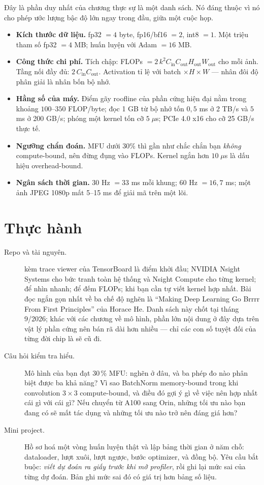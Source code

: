 \documentclass[../../deep_learning.tex]{subfiles}
\begin{document}
Đây là phần duy nhất của chương thực sự là một danh sách. Nó đáng thuộc vì nó cho phép ước lượng bậc độ lớn ngay trong đầu, giữa một cuộc họp.

\begin{itemize}
\item \textbf{Kích thước dữ liệu.} fp32 \(=4\) byte, fp16/bf16 \(=2\), int8 \(=1\). Một triệu tham số fp32 \(=4\) MB; huấn luyện với Adam \(=16\) MB.
\item \textbf{Công thức chi phí.} Tích chập: FLOPs \(= 2\,k^2 C_{\text{in}} C_{\text{out}} H_{\text{out}} W_{\text{out}}\) cho mỗi ảnh. Tầng nối đầy đủ: \(2\,C_{\text{in}}C_{\text{out}}\). Activation tỉ lệ với batch \(\times H \times W\) --- nhân đôi độ phân giải là nhân bốn bộ nhớ.
\item \textbf{Hằng số của máy.} Điểm gãy roofline của phần cứng hiện đại nằm trong khoảng \(100\)--\(350\) FLOP/byte; đọc 1 GB từ bộ nhớ tốn \(0{,}5\) ms ở 2 TB/s và \(5\) ms ở 200 GB/s; phóng một kernel tốn cỡ \(5\;\mu\)s; PCIe 4.0 x16 cho cỡ 25 GB/s thực tế.
\item \textbf{Ngưỡng chẩn đoán.} MFU dưới \(30\%\) thì gần như chắc chắn bạn \emph{không} compute-bound, nên đừng đụng vào FLOPs. Kernel ngắn hơn \(10\;\mu\)s là dấu hiệu overhead-bound.
\item \textbf{Ngân sách thời gian.} 30 Hz \(=33\) ms mỗi khung; 60 Hz \(=16{,}7\) ms; một ảnh JPEG 1080p mất 5--15 ms để giải mã trên một lõi.
\end{itemize}

\section{Thực hành}

\begin{description}
\item[Repo và tài nguyên.]  kèm trace viewer của TensorBoard là điểm khởi đầu; NVIDIA Nsight Systems cho bức tranh toàn hệ thống và Nsight Compute cho từng kernel;  để nhìn nhanh;  để đếm FLOPs;  khi bạn cần tự viết kernel hợp nhất. Bài đọc ngắn gọn nhất về ba chế độ nghẽn là ``Making Deep Learning Go Brrrr From First Principles'' của Horace He. Danh sách này chốt tại tháng 9/2026; khác với các chương về mô hình, phần lớn nội dung ở đây dựa trên vật lý phần cứng nên bán rã dài hơn nhiều --- chỉ các con số tuyệt đối của từng đời chip là sẽ cũ đi.
\item[Câu hỏi kiểm tra hiểu.] Mô hình của bạn đạt 30\,\% MFU: nghẽn ở đâu, và ba phép đo nào phân biệt được ba khả năng? Vì sao BatchNorm memory-bound trong khi convolution \(3\times3\) compute-bound, và điều đó gợi ý gì về việc nên hợp nhất cái gì với cái gì? Nếu chuyển từ A100 sang Orin, những tối ưu nào bạn đang có sẽ mất tác dụng và những tối ưu nào trở nên đáng giá hơn?
\item[Mini project.] Hồ sơ hoá một vòng huấn luyện thật và lập bảng thời gian ở năm chỗ: dataloader, lượt xuôi, lượt ngược, bước optimizer, và đồng bộ. Yêu cầu bắt buộc: \emph{viết dự đoán ra giấy trước khi mở profiler}, rồi ghi lại mức sai của từng dự đoán. Bản ghi mức sai đó có giá trị hơn bảng số liệu.
\end{description}
\end{document}
